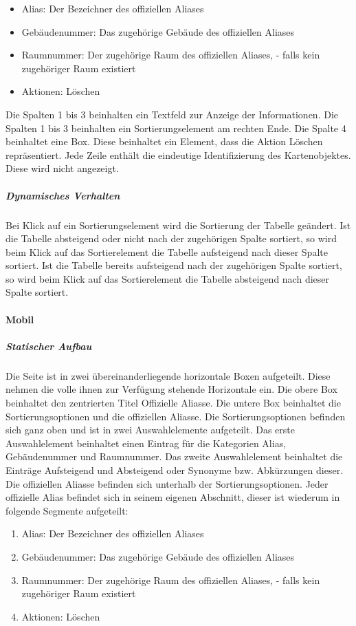 \begin{itemize}
    \item Alias: Der Bezeichner des offiziellen Aliases
    \item Gebäudenummer: Das zugehörige Gebäude des offiziellen Aliases
    \item Raumnummer: Der zugehörige Raum des offiziellen Aliases, \dq - \dq{} falls kein zugehöriger Raum existiert
    \item Aktionen: Löschen
\end{itemize}

Die Spalten 1 bis 3 beinhalten ein Textfeld zur Anzeige der Informationen.
Die Spalten 1 bis 3 beinhalten ein Sortierungselement am rechten Ende.
Die Spalte 4 beinhaltet eine Box. Diese beinhaltet ein Element, dass die Aktion \dq Löschen \dq{} repräsentiert.
Jede Zeile enthält die eindeutige Identifizierung des Kartenobjektes. Diese wird nicht angezeigt.

\subparagraph*{Dynamisches Verhalten}
Bei Klick auf ein Sortierungselement wird die Sortierung der Tabelle geändert.
Ist die Tabelle absteigend oder nicht nach der zugehörigen Spalte sortiert, so wird beim Klick auf das Sortierelement die Tabelle aufsteigend nach dieser Spalte sortiert.
Ist die Tabelle bereits aufsteigend nach der zugehörigen Spalte sortiert, so wird beim Klick auf das Sortierelement die Tabelle absteigend nach dieser Spalte sortiert.

\paragraph*{Mobil}
\subparagraph*{Statischer Aufbau}
Die Seite ist in zwei übereinanderliegende horizontale Boxen aufgeteilt. Diese nehmen die volle ihnen zur Verfügung stehende Horizontale ein.
Die obere Box beinhaltet den zentrierten Titel \dq Offizielle Aliasse\dq.
Die untere Box beinhaltet die Sortierungsoptionen und die offiziellen Aliasse.
Die Sortierungsoptionen befinden sich ganz oben und ist in zwei Auswahlelemente aufgeteilt. 
Das erste Auswahlelement beinhaltet einen Eintrag für die Kategorien Alias, Gebäudenummer und Raumnummer.
Das zweite Auswahlelement beinhaltet die Einträge \dq Aufsteigend \dq{} und \dq Absteigend \dq{} oder Synonyme bzw. Abkürzungen dieser.
Die offiziellen Aliasse befinden sich unterhalb der Sortierungsoptionen.
Jeder offizielle Alias befindet sich in seinem eigenen Abschnitt, dieser ist wiederum in folgende Segmente aufgeteilt:

\begin{enumerate}
    \item Alias: Der Bezeichner des offiziellen Aliases
    \item Gebäudenummer: Das zugehörige Gebäude des offiziellen Aliases
    \item Raumnummer: Der zugehörige Raum des offiziellen Aliases, \dq - \dq{} falls kein zugehöriger Raum existiert
    \item Aktionen: Löschen
\end{enumerate}

